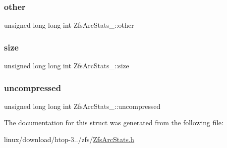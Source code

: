 \subsubsection{\texorpdfstring{other}{other}}
{\footnotesize\ttfamily unsigned long long int Zfs\+Arc\+Stats\+\_\+\+::other}

\mbox{\label{structZfsArcStats___a787dc732d92c75d02c260fa75004b078}} 
\subsubsection{\texorpdfstring{size}{size}}
{\footnotesize\ttfamily unsigned long long int Zfs\+Arc\+Stats\+\_\+\+::size}

\mbox{\label{structZfsArcStats___a7371a55d8f26dbeb5846ab62fd0b37c3}} 
\subsubsection{\texorpdfstring{uncompressed}{uncompressed}}
{\footnotesize\ttfamily unsigned long long int Zfs\+Arc\+Stats\+\_\+\+::uncompressed}



The documentation for this struct was generated from the following file\+:\begin{DoxyCompactItemize}
\item 
linux/download/htop-\/3../zfs/\hyperlink{ZfsArcStats_8h}{Zfs\+Arc\+Stats.\+h}\end{DoxyCompactItemize}
